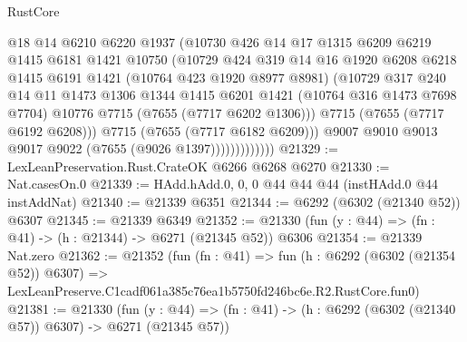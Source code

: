 \begin{lexlean}{RustCore}
\begin{coremodule}
                          @18
                          @14
                          @6210
                          @6220
                          @1937
                          (@10730
                            @426
                            @14
                            @17
                            @1315
                            @6209
                            @6219
                            @1415
                            @6181
                            @1421
                            @10750
                            (@10729
                              @424
                              @319
                              @14
                              @16
                              @1920
                              @6208
                              @6218
                              @1415
                              @6191
                              @1421
                              (@10764 @423 @1920 @8977 @8981)
                              (@10729
                                @317
                                @240
                                @14
                                @11
                                @1473
                                @1306
                                @1344
                                @1415
                                @6201
                                @1421
                                (@10764 @316 @1473 @7698 @7704)
                                @10776
                                @7715
                                (@7655 (@7717 @6202 @1306)))
                              @7715
                              (@7655 (@7717 @6192 @6208)))
                            @7715
                            (@7655 (@7717 @6182 @6209)))
                          @9007
                          @9010
                          @9013
                          @9017
                          @9022
                          (@7655 (@9026 @1397)))))))))))))
@21329 := LexLeanPreservation.Rust.CrateOK @6266 @6268 @6270
@21330 := Nat.casesOn.{0}
@21339 := HAdd.hAdd.{0, 0, 0} @44 @44 @44 (instHAdd.{0} @44 instAddNat)
@21340 := @21339 @6351
@21344 := @6292 (@6302 (@21340 @52)) @6307
@21345 := @21339 @6349
@21352 := @21330 (fun (y : @44) => (fn : @41) -> (h : @21344) -> @6271 (@21345 @52)) @6306
@21354 := @21339 Nat.zero
@21362 := @21352
    (fun (fn : @41) =>
    fun (h : @6292 (@6302 (@21354 @52)) @6307) =>
    LexLeanPreserve.C1cadf061a385c76ea1b5750fd246bc6e.R2.RustCore.fun0)
@21381 := @21330
    (fun (y : @44) => (fn : @41) -> (h : @6292 (@6302 (@21340 @57)) @6307) -> @6271 (@21345 @57))

\end{coremodule}
\end{lexlean}
